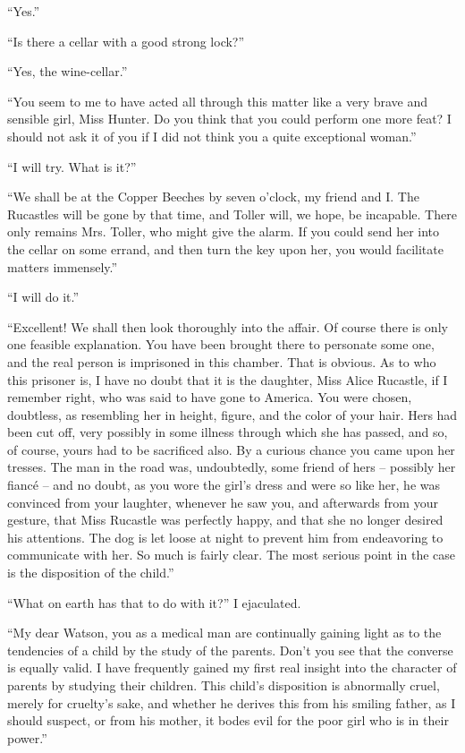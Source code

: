 “Yes.”

“Is there a cellar with a good strong lock?”

“Yes, the wine-cellar.”

“You seem to me to have acted all through this matter like
a very brave and sensible girl, Miss Hunter. Do you think
that you could perform one more feat? I should not ask it of
you if I did not think you a quite exceptional woman.”

“I will try. What is it?”

“We shall be at the Copper Beeches by seven o’clock, my
friend and I. The Rucastles will be gone by that time, and
Toller will, we hope, be incapable. There only remains Mrs.
Toller, who might give the alarm. If you could send her into
the cellar on some errand, and then turn the key upon her,
you would facilitate matters immensely.”

“I will do it.”

“Excellent! We shall then look thoroughly into the affair.
Of course there is only one feasible explanation. You have
been brought there to personate some one, and the real person
is imprisoned in this chamber. That is obvious. As to who
this prisoner is, I have no doubt that it is the daughter, Miss
Alice Rucastle, if I remember right, who was said to have
gone to America. You were chosen, doubtless, as resembling
her in height, figure, and the color of your hair. Hers had
been cut off, very possibly in some illness through which she
has passed, and so, of course, yours had to be sacrificed also.
By a curious chance you came upon her tresses. The man in
the road was, undoubtedly, some friend of hers -- possibly her
fiancé -- and no doubt, as you wore the girl’s dress and were so
like her, he was convinced from your laughter, whenever he
saw you, and afterwards from your gesture, that Miss Rucastle
was perfectly happy, and that she no longer desired his attentions.
The dog is let loose at night to prevent him from
endeavoring to communicate with her. So much is fairly
clear. The most serious point in the case is the disposition
of the child.”

“What on earth has that to do with it?” I ejaculated.

“My dear Watson, you as a medical man are continually
gaining light as to the tendencies of a child by the study of the
parents. Don’t you see that the converse is equally valid. I
have frequently gained my first real insight into the character
of parents by studying their children. This child’s disposition
is abnormally cruel, merely for cruelty’s sake, and whether he
derives this from his smiling father, as I should suspect, or from
his mother, it bodes evil for the poor girl who is in their power.”

